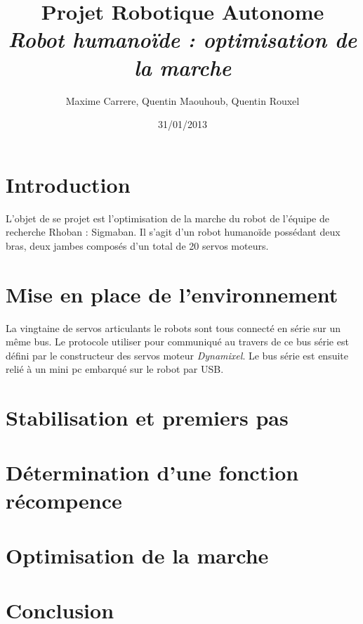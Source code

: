 \documentclass[11pt]{article}
\title{Projet Robotique Autonome\\
\textit{Robot humanoïde : optimisation de la marche}}
\author{Maxime Carrere, Quentin Maouhoub, Quentin Rouxel}
\date{31/01/2013}
\begin{document}
\maketitle

\section{Introduction}

L'objet de se projet est l'optimisation de la marche du robot de l'équipe 
de recherche Rhoban : Sigmaban. Il s'agit d'un robot humanoïde possédant deux bras,
deux jambes composés d'un total de 20 servos moteurs.

\section{Mise en place de l'environnement}

La vingtaine de servos articulants le robots sont tous connecté en série sur un même 
bus. Le protocole utiliser pour communiqué au travers de ce bus série est défini par le
constructeur des servos moteur \textit{Dynamixel}. Le bus série est ensuite relié à un mini pc
embarqué sur le robot par USB.

\section{Stabilisation et premiers pas}
\section{Détermination d'une fonction récompence}
\section{Optimisation de la marche}
\section{Conclusion}
\end{document}
